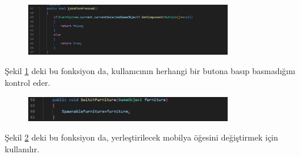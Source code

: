 \documentclass[12pt, a4paper]{article}
\begin{document}
	\begin{figure}[!ht]
		\caption{}
		\centering
		\includegraphics[width=0.8\textwidth]{Ekran4.PNG}
		
		\label{mobilya3}
	\end{figure}
	
	Şekil \ref{mobilya3} deki bu fonksiyon da, kullanıcının herhangi bir butona basıp basmadığını kontrol eder.\cite{drive}
	\begin{figure}[!ht]
		\caption{}
		\centering
		\includegraphics[width=0.8\textwidth]{Ekran5.PNG}
		
		\label{mobilya4}
	\end{figure}
	\newpage
	Şekil \ref{mobilya4} deki bu fonksiyon da, yerleştirilecek mobilya öğesini değiştirmek için kullanılır.\cite{drive}
\end{document}
